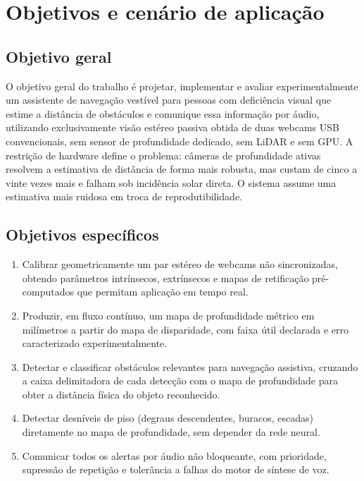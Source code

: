 \documentclass[12pt]{article}
\begin{document}
\section{Objetivos e cenário de aplicação}

\subsection{Objetivo geral}

O objetivo geral do trabalho é projetar, implementar e avaliar
experimentalmente um assistente de navegação vestível para pessoas com
deficiência visual que estime a distância de obstáculos e comunique essa
informação por áudio, utilizando exclusivamente visão estéreo passiva obtida
de duas webcams USB convencionais, sem sensor de profundidade dedicado, sem
LiDAR e sem GPU. A restrição de hardware define o problema: câmeras de
profundidade ativas resolvem a estimativa de distância de forma mais robusta,
mas custam de cinco a vinte vezes mais e falham sob incidência solar direta. O
sistema assume uma estimativa mais ruidosa em troca de reprodutibilidade.

\subsection{Objetivos específicos}

\begin{enumerate}
\item Calibrar geometricamente um par estéreo de webcams não sincronizadas,
obtendo parâmetros intrínsecos, extrínsecos e mapas de retificação
pré-computados que permitam aplicação em tempo real.
\item Produzir, em fluxo contínuo, um mapa de profundidade métrico em
milímetros a partir do mapa de disparidade, com faixa útil declarada e erro
caracterizado experimentalmente.
\item Detectar e classificar obstáculos relevantes para navegação assistiva,
cruzando a caixa delimitadora de cada detecção com o mapa de profundidade para
obter a distância física do objeto reconhecido.
\item Detectar desníveis de piso (degraus descendentes, buracos, escadas)
diretamente no mapa de profundidade, sem depender da rede neural.
\item Comunicar todos os alertas por áudio não bloqueante, com prioridade,
supressão de repetição e tolerância a falhas do motor de síntese de voz.
\end{enumerate}
\end{document}
